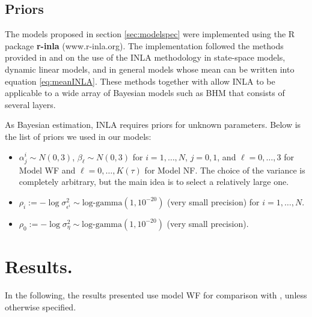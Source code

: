 \documentclass[12pt]{amsart}
\theoremstyle{plain}
\theoremstyle{definition}
\theoremstyle{remark}
\newcommand{\lb}[1]{\color{MidnightBlue}\textbf{[LB: #1]}\normalcolor}
\newcommand{\jeg}[1]{\color{ProcessBlue}\textbf{[JEG: #1]}\normalcolor}
\begin{document}
\subsection{Priors}
The models proposed in section \ref{sec:modelspec} were
implemented using the R package \textbf{r-inla} (www.r-inla.org). The
implementation followed the methods provided in \cite{Ruiz-Cardenas2012} and
\cite{Muff2015} on the use of the INLA methodology in state-space models,
dynamic linear models, and in general models whose mean can be written
into equation \eqref{eq:meanINLA}. These
methods together with \cite{Martins2013} allow INLA to be applicable to a wide array of Bayesian models such as BHM that consists of several layers. 

As Bayesian estimation, INLA requires priors for unknown parameters. Below is the list of priors we used in our models:
\begin{itemize}
\item $\alpha^i_j\sim N(0,3)$, $\beta_\ell \sim N(0,3)$ for $i=1,\ldots,N$, $j=0,1$, and  $\ell=0,\ldots,3$
  for Model WF and $\ell=0,\ldots,K(\tau)$ for Model NF. The choice of the variance is
  completely arbitrary, but the main idea is to select a relatively large one.
  
\item $\rho_i := -\log \sigma^2_{\epsilon^i}\sim \text{log-gamma}(1,10^{-20})$
  (very small precision) for $i=1,\ldots,N$.
  
\item $\rho_0 := -\log \sigma^2_\eta \sim \text{log-gamma}(1,10^{-20})$ (very
  small precision).
\end{itemize}


\section{Results.}
\label{sec:results}

In the following, the results presented use model WF for comparison with \citet{Barboza2014}, unless otherwise specified.

\end{document}
